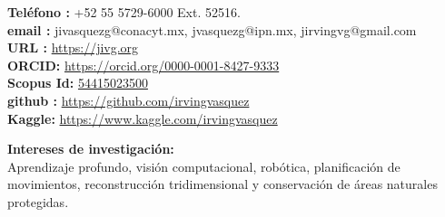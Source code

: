 \documentclass[10pt]{article}
\begin{document}
\begin{center}
\begin{minipage}[b]{0.6\linewidth}
\textbf{Teléfono \faPhone:} +52 55 5729-6000 Ext. 52516. \\
\textbf{email \faEnvelopeO:} jivasquezg@conacyt.mx, jvasquezg@ipn.mx, jirvingvg@gmail.com\\
\textbf{URL \faExternalLink:} \url{https://jivg.org} \\
\textbf{ORCID:} \url{https://orcid.org/0000-0001-8427-9333}\\
\textbf{Scopus Id:} \href{https://www.scopus.com/authid/detail.uri?authorId=54415023500}{54415023500}\\
\textbf{github \faGithub :} \url{https://github.com/irvingvasquez} \\
\textbf{Kaggle:} \url{https://www.kaggle.com/irvingvasquez}
\end{minipage}



\end{center}


\begin{center}
{\bf Intereses de investigación:} \\ Aprendizaje profundo, visión computacional, robótica, planificación de movimientos, reconstrucción tridimensional y conservación de áreas naturales protegidas. 
\end{center}
\end{document}
